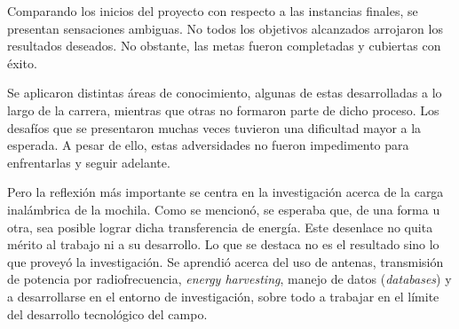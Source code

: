 
Comparando los inicios del proyecto con respecto a las instancias finales, se presentan sensaciones ambiguas. No todos los objetivos alcanzados arrojaron los resultados deseados. No obstante, las metas fueron completadas y cubiertas con éxito.

Se aplicaron distintas áreas de conocimiento, algunas de estas desarrolladas a lo largo de la carrera, mientras que otras no formaron parte de dicho proceso. Los desafíos que se presentaron muchas veces tuvieron una dificultad mayor a la esperada. A pesar de ello, estas adversidades no fueron impedimento para enfrentarlas y seguir adelante.

Pero la reflexión más importante se centra en la investigación acerca de la carga inalámbrica de la mochila. Como se mencionó, se esperaba que, de una forma u otra, sea posible lograr dicha transferencia de energía. Este desenlace no quita mérito al trabajo ni a su desarrollo. Lo que se destaca no es el resultado sino lo que proveyó la investigación. Se aprendió acerca del uso de antenas, transmisión de potencia por radiofrecuencia, \textit{energy harvesting}, manejo de datos (\textit{databases}) y a desarrollarse en el entorno de investigación, sobre todo a trabajar en el límite del desarrollo tecnológico del campo.
